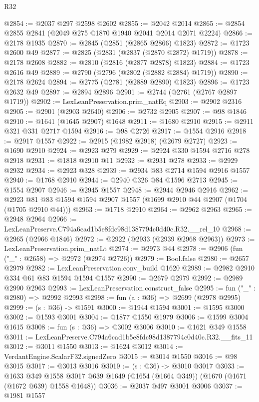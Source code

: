 \begin{lexlean}{R32}
\begin{coremodule}
@2854 := @2037 @297 @2598 @2602
@2855 := @2042 @2014
@2865 := @2854 @2855 @2841 (@2049 @275 @1870 @1940 @2041 @2014 @2071 @2224)
@2866 := @2178 @1935
@2870 := @2845 (@2851 (@2865 @2866) @1823)
@2872 := @1723 @2600 @49
@2877 := @2825 (@2831 (@2837 (@2870 @2872) @1719))
@2878 := @2178 @2608
@2882 := @2810 (@2816 (@2877 @2878) @1823)
@2884 := @1723 @2616 @49
@2889 := @2790 (@2796 (@2802 (@2882 @2884) @1719))
@2890 := @2178 @2624
@2894 := @2775 (@2781 (@2889 @2890) @1823)
@2896 := @1723 @2632 @49
@2897 := @2894 @2896
@2901 := @2744 (@2761 (@2767 @2897 @1719))
@2902 := LexLeanPreservation.prim_natEq
@2903 := @2902 @2316
@2905 := @2901 (@2903 @2640)
@2906 := @2732 @2905
@2907 := @98 @1846
@2910 := @1641 (@1645 @2907) @1648
@2911 := @1680 @2910
@2915 := @2911 @321 @331 @2717 @1594
@2916 := @98 @2726
@2917 := @1554 @2916
@2918 := @2917 @1557
@2922 := @2915 (@1982 @2918) (@2679 @2727)
@2923 := @1690 @2910
@2924 := @2923 @279
@2929 := @2924 @330 @1594 @2716 @278 @2918
@2931 := @1818 @2910 @11
@2932 := @2931 @278
@2933 := @2929 @2932
@2934 := @2923 @328
@2939 := @2934 @83 @2714 @1594 @2916 @1557
@2940 := @1768 @2910
@2944 := @2940 @326 @84 @1596 @2713
@2945 := @1554 @2907
@2946 := @2945 @1557
@2948 := @2944 @2946 @2916
@2962 := @2923 @81 @83 @1594 @1594 @2907 @1557 (@1699 @2910 @44 @2907 (@1704 (@1705 @2910 @44)))
@2963 := @1718 @2910
@2964 := @2962 @2963
@2965 := @2948 @2964
@2966 := LexLeanPreserve.C794a6cad1b5e8fdc98d1387794c0d40c.R32.__rel_10
@2968 := @2965 (@2966 @1846)
@2972 := @2922 (@2933 (@2939 @2968 @2963))
@2973 := LexLeanPreservation.prim_natLt
@2974 := @2973 @44
@2978 := @2906 (fun ("_" : @2658) => @2972 (@2974 @2726))
@2979 := Bool.false
@2980 := @2657 @2979
@2982 := LexLeanPreservation.conv_build @1620
@2989 := @2982 @2910 @334 @61 @83 @1594 @1594 @1557
@2990 := @2679 @2979
@2992 := @2989 @2990 @2963
@2993 := LexLeanPreservation.construct_false
@2995 := fun ("_" : @2980) => @2992 @2993
@2998 := fun (a : @36) => @2699 (@2978 @2995)
@2999 := (s : @36) -> @1591
@3000 := @1944 @1594
@3001 := @1595 @3000
@3002 := @1593 @3001
@3004 := @1877 @1550 @1979
@3006 := @1599 @3004 @1615
@3008 := fun (s : @36) => @3002 @3006
@3010 := @1621 @349 @1558
@3011 := LexLeanPreserve.C794a6cad1b5e8fdc98d1387794c0d40c.R32.__fits_11
@3012 := @3011 @1550
@3013 := @1624 @3012
@3014 := VerdantEngine.ScalarF32.signedZero
@3015 := @3014 @1550
@3016 := @98 @3015
@3017 := @3013 @3016
@3019 := (s : @36) -> @3010 @3017
@3033 := @1633
    @349
    @1558
    @3017
    @639
    @1649
    (@1654 (@1664 @349))
    (@1670 (@1671 (@1672 @639) @1558 @1648))
@3036 := @2037 @497 @3001 @3006
@3037 := @1981 @1557

\end{coremodule}
\end{lexlean}
